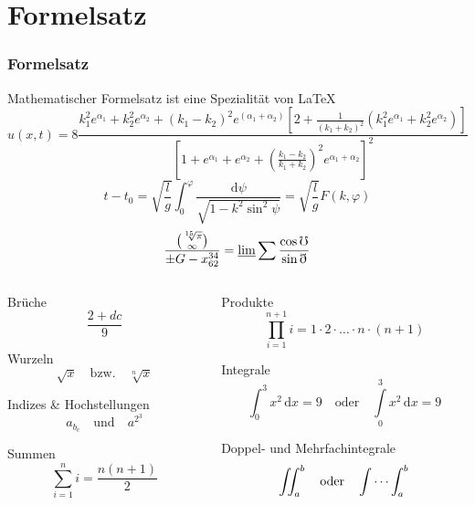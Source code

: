\documentclass[9pt]{beamer}
\begin{document}
\section{Formelsatz}
\begin{frame}
	\frametitle{Formelsatz}
	\begin{block}{Mathematischer Formelsatz ist eine Spezialität von \LaTeX}
		\[
		u(x,t)= 8 \frac{k_{1}^{2}e^{\alpha_{1}} + k_{2}^{2}e^{\alpha_{2}} + (k_{1}-k_{2})^{2}e^{(\alpha_{1}+ \alpha_{2})} \left[2 + \frac{1}{(k_{1} + k_{2})^{2}} ( k_{1}^{2}e^{\alpha_{1}} + k_{2}^{2}e^{\alpha_{2}}) \right]}{\left[1+e^{\alpha_{1}} + e^{\alpha_{2}} + \left(\frac{k_{1} - k_{2}}{k_{1}+k_{2}} \right)^{2} e^{\alpha_{1}+ \alpha_{2}} \right]^{2}}
		\]
		\[
			t-t_{0}=\sqrt{\frac{l}{g}}\int_{0}^{\varphi}{\frac{\mathrm{d}\psi}{\sqrt{1-k^{2}\sin^{2} {\psi}}}} = \sqrt{\frac{l}{g}} F(k,\varphi)
		\]
		\[
			\frac{\binom{\sqrt[15]{\pi}}{\infty}}{\pm G - x_{62}^{34}} = \varliminf \sum \frac{\cos \mho}{\sin \eth}
		\]
	\end{block}
\end{frame}

\begin{frame}
	\begin{columns}
		\begin{column}{0.49\textwidth}
			\begin{exampleblock}{Brüche}
				\[\frac{2+dc}{9}\]
			\end{exampleblock}
			\begin{exampleblock}{Wurzeln}
				\[
					\sqrt{x}
					\quad\text{bzw.}\quad
					\sqrt[n]{x}
				\]
			\end{exampleblock}
			\begin{exampleblock}{Indizes \& Hochstellungen}
				\[a_{b_c} \quad\text{und}\quad a^{2^3}\]
			\end{exampleblock}
			\begin{exampleblock}{Summen}
				\[\sum\limits_{i=1}^n i = \frac{n(n+1)}{2}\]
			\end{exampleblock}
		\end{column}
		\begin{column}{0.49\textwidth}
			\begin{exampleblock}{Produkte}
				\[\prod\limits_{i=1}^{n+1}i = 1\cdot 2\cdot\ldots\cdot n\cdot (n+1)\]
			\end{exampleblock}
			\begin{exampleblock}{Integrale}
				\[
					\int_0^3 x^2\,\mathrm{d}x = 9
					\quad\text{oder}\quad
					\int\limits_0^3 x^2 \,\mathrm{d}x = 9
				\]
			\end{exampleblock}
			\begin{exampleblock}{Doppel- und Mehrfachintegrale}
				\[
					\iint_a^b
					\quad\text{oder}\quad
					\idotsint_a^b
				\]
			\end{exampleblock}
		\end{column}
	\end{columns}
\end{frame}
\end{document}
